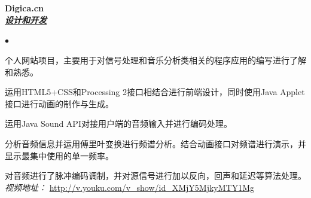 \documentclass[UTF8]{ctexart}
\newcommand{\lineunder}{\vspace*{-8pt} \\
\hspace*{-18pt} \hrulefill \\}
\newcommand{\header}[1]{\large \vspace*{12pt}{\Large \hspace*{-15pt}\vspace*{6pt} \textsc{#1}} \vspace*{-6pt} \lineunder}
\newcommand{\website}[3]{{\normalsize \textbf{#1}\\
\underline{\textbf{\emph{#3}}}\\
}}
\newenvironment{achievements}{
\begin{list}
        {$\bullet$}{\topsep 0pt
        \itemsep 0pt}}{\vspace*{4pt}
\end{list}
}
\begin{document}
\header{网站项目}
\website{Digica.cn}{}{设计和开发}
\begin{achievements}
    \item 个人网站项目，主要用于对信号处理和音乐分析类相关的程序应用的编写进行了解和熟悉。
    \item 运用HTML5+CSS和Processing 2接口相结合进行前端设计，同时使用Java Applet接口进行动画的制作与生成。
    \item 运用Java Sound API对接用户端的音频输入并进行编码处理。
    \item 分析音频信息并运用傅里叶变换进行频谱分析。结合动画接口对频谱进行演示，并显示最集中使用的单一频率。
    \item 对音频进行了脉冲编码调制，并对源信号进行加以反向，回声和延迟等算法处理。\\ \vspace*{6pt}
    \emph{视频地址：} \url{http://v.youku.com/v_show/id_XMjY5MjkyMTY1Mg}
\end{achievements}

\newpage
\vspace*{-20pt}
\end{document}
